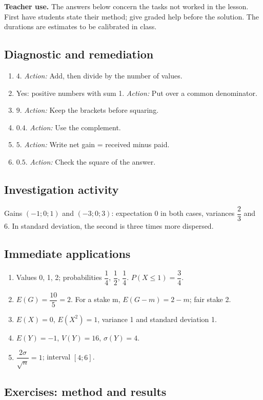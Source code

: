 \label{C08-CORR}
\textbf{Teacher use.} The answers below concern the tasks not worked in the lesson. First have students state their method; give graded help before the solution. The durations are estimates to be calibrated in class.
\subsection*{Diagnostic and remediation}
\begin{enumerate}
\item $4$. \textit{Action:} Add, then divide by the number of values.
\item Yes: positive numbers with sum 1. \textit{Action:} Put over a common denominator.
\item $9$. \textit{Action:} Keep the brackets before squaring.
\item $0.4$. \textit{Action:} Use the complement.
\item $5$. \textit{Action:} Write net gain = received minus paid.
\item $0.5$. \textit{Action:} Check the square of the answer.
\end{enumerate}
\subsection*{Investigation activity}
Gains $(-1;0;1)$ and $(-3;0;3)$: expectation 0 in both cases, variances $\dfrac{2}{3}$ and 6. In standard deviation, the second is three times more dispersed.
\subsection*{Immediate applications}
\begin{enumerate}
\item Values 0, 1, 2; probabilities $\dfrac{1}{4}$, $\dfrac{1}{2}$, $\dfrac{1}{4}$. $P(X\leq1)=\dfrac{3}{4}$.
\item $E(G)=\dfrac{10}{5}=2$. For a stake m, $E(G-m)=2-m$; fair stake 2.
\item $E(X)=0$, $E(X^2)=1$, variance 1 and standard deviation 1.
\item $E(Y)=-1$, $V(Y)=16$, $\sigma(Y)=4$.
\item $\dfrac{2\sigma}{\sqrt n}=1$; interval $[4;6]$.
\end{enumerate}
\subsection*{Exercises: method and results}
